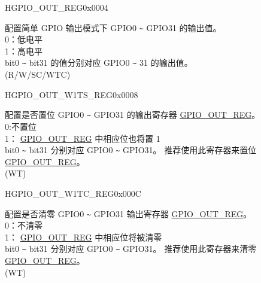 \begin{register}{H}{GPIO\_OUT\_REG}{0x0004}\label{regdesc:GPIOOUTREG}
%
\regnewline%
\begin{regdesc}\begin{reglist}
\label{fielddesc:GPIOOUTDATAORIG}\item [GPIO\_OUT\_DATA\_ORIG] 配置简单 GPIO 输出模式下 GPIO0 \verb+~+ GPIO31 的输出值。\\
0：低电平\\
1：高电平 \\
 bit0 \verb+~+ bit31 的值分别对应 GPIO0 \verb+~+ 31 的输出值。\\
(R/W/SC/WTC)
\end{reglist}\end{regdesc}
\end{register}


\begin{register}{H}{GPIO\_OUT\_W1TS\_REG}{0x0008}\label{regdesc:GPIOOUTW1TSREG}
%
\regnewline%
\begin{regdesc}\begin{reglist}
\label{fielddesc:GPIOOUTW1TS}\item [GPIO\_OUT\_W1TS] 配置是否置位 GPIO0 \verb+~+ GPIO31 的输出寄存器 \hyperref[regdesc:GPIOOUTREG]{GPIO\_OUT\_REG}。\\
0:不置位\\
1： \hyperref[regdesc:GPIOOUTREG]{GPIO\_OUT\_REG} 中相应位也将置 1 \\
bit0 \verb+~+ bit31 分别对应 GPIO0 \verb+~+ GPIO31。
推荐使用此寄存器来置位  \hyperref[regdesc:GPIOOUTREG]{GPIO\_OUT\_REG}。\\
(WT)
\end{reglist}\end{regdesc}
\end{register}


\begin{register}{H}{GPIO\_OUT\_W1TC\_REG}{0x000C}\label{regdesc:GPIOOUTW1TCREG}
%
\regnewline%
\begin{regdesc}\begin{reglist}
\label{fielddesc:GPIOOUTW1TC}\item [GPIO\_OUT\_W1TC] 配置是否清零 GPIO0 \verb+~+ GPIO31 输出寄存器  \hyperref[regdesc:GPIOOUTREG]{GPIO\_OUT\_REG}。\\
0：不清零 \\
 1： \hyperref[regdesc:GPIOOUTREG]{GPIO\_OUT\_REG} 中相应位将被清零 \\
bit0 \verb+~+ bit31 分别对应 GPIO0 \verb+~+ GPIO31。
推荐使用此寄存器来清零  \hyperref[regdesc:GPIOOUTREG]{GPIO\_OUT\_REG}。\\
(WT)
\end{reglist}\end{regdesc}
\end{register}


